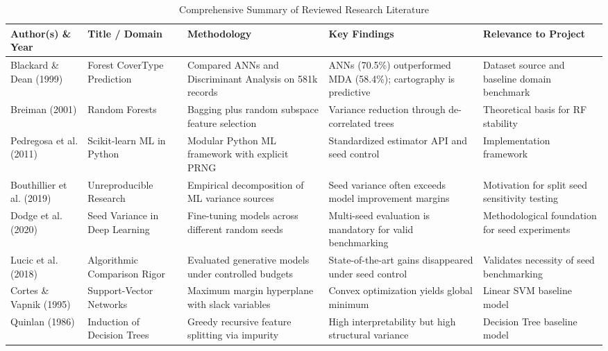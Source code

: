 \begin{table}[H]
\centering
\small
\caption{Comprehensive Summary of Reviewed Research Literature}
\label{tab:literature_summary}
\begin{tabular}{p{2.2cm} p{2.8cm} p{3.2cm} p{3.2cm} p{2.2cm}}
\toprule
\textbf{Author(s) \& Year} & \textbf{Title / Domain} & \textbf{Methodology} & \textbf{Key Findings} & \textbf{Relevance to Project} \\
\midrule
Blackard \& Dean (1999) \cite{blackard1999comparative} & Forest CoverType Prediction & Compared ANNs and Discriminant Analysis on 581k records & ANNs (70.5\%) outperformed MDA (58.4\%); cartography is predictive & Dataset source and baseline domain benchmark \\
\midrule
Breiman (2001) \cite{breiman2001random} & Random Forests & Bagging plus random subspace feature selection & Variance reduction through de-correlated trees & Theoretical basis for RF stability \\
\midrule
Pedregosa et al. (2011) \cite{pedregosa2011scikit} & Scikit-learn ML in Python & Modular Python ML framework with explicit PRNG & Standardized estimator API and seed control & Implementation framework \\
\midrule
Bouthillier et al. (2019) \cite{bouthillier2019unreproducible} & Unreproducible Research & Empirical decomposition of ML variance sources & Seed variance often exceeds model improvement margins & Motivation for split seed sensitivity testing \\
\midrule
Dodge et al. (2020) \cite{dodge2020fine} & Seed Variance in Deep Learning & Fine-tuning models across different random seeds & Multi-seed evaluation is mandatory for valid benchmarking & Methodological foundation for seed experiments \\
\midrule
Lucic et al. (2018) \cite{lucic2018gans} & Algorithmic Comparison Rigor & Evaluated generative models under controlled budgets & State-of-the-art gains disappeared under seed control & Validates necessity of seed benchmarking \\
\midrule
Cortes \& Vapnik (1995) \cite{cortes1995support} & Support-Vector Networks & Maximum margin hyperplane with slack variables & Convex optimization yields global minimum & Linear SVM baseline model \\
\midrule
Quinlan (1986) \cite{quinlan1986induction} & Induction of Decision Trees & Greedy recursive feature splitting via impurity & High interpretability but high structural variance & Decision Tree baseline model \\
\bottomrule
\end{tabular}
\end{table}

